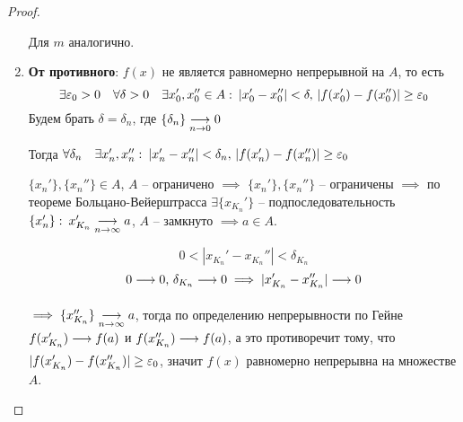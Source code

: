 \begin{proof}
\begin{enumerate}
            Для $m$ аналогично.

        \item
            \textbf{От противного}: $f(x)$ не является равномерно непрерывной на $A$, то есть
            \[ 
                \exists \varepsilon_0 > 0 \quad \forall \delta > 0 \quad \exists x_0', x_0'' \in A: \: | x_0' - x_0'' | < \delta,
                \, | f(x_0') - f(x_0'') | \ge \varepsilon_0
            \]
            Будем брать $\delta = \delta_n$, где $\{ \delta_n \} \underset{n \to 0}{\longrightarrow} 0$

            Тогда $\forall \delta_n \quad \exists x_n', x_n'': \: |x_n' - x_n''| < \delta_n, \, |f(x_n') - f(x_n'')| \ge \varepsilon_0$

            $\{x_n'\}, \{x_n''\} \in A$, $A$ -- ограничено $\implies$ $\{x_n'\}, \{x_n''\}$ -- ограничены
            $\implies$ по теореме Больцано-Вейерштрасса $\exists \{x_{K_n}'\}$ -- подпоследовательность
            $\{x_n'\}: \: x_{K_n}' \underset{n \to \infty}{\longrightarrow} a$, $A$ -- замкнуто $\implies a \in A$.

            \[ 0 < |x_{K_n}' - x_{K_n}''| < \delta_{K_n} \]
            \[ 0 \underset{}{\longrightarrow} 0, \, \delta_{K_n} \underset{}{\longrightarrow} 0 \implies |x_{K_n}' - x_{K_n}''| \underset{}{\longrightarrow} 0 \]
            
            $\implies \{x_{K_n}''\} \underset{n \to \infty}{\longrightarrow} a$, тогда по определению непрерывности по Гейне
            $f(x_{K_n}') \underset{}{\longrightarrow} f(a)$ и $f(x_{K_n}'') \underset{}{\longrightarrow} f(a)$, а это противоречит тому, что
            $|f(x_{K_n}') - f(x_{K_n}'')| \ge \varepsilon_0$, значит $f(x)$ равномерно непрерывна на множестве $A$.
    \end{enumerate}
\end{proof}

